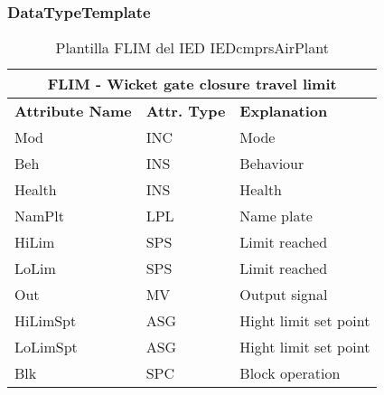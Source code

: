     \subsubsection{DataTypeTemplate}
    \begin{table}[H]
    \begin{center}
    \begin{tabular}{|l|l|p{8.5cm}|}
            \hline
            \multicolumn{3}{|c|}{\cellcolor[gray]{0.8} \textbf{ FLIM}  - Wicket gate closure travel limit} \\
            \hline
            \textbf{Attribute Name} & \textbf{Attr. Type} & \textbf{Explanation} \\
            \hline 
            Mod & INC & Mode \\
            \hline
            Beh & INS & Behaviour \\
            \hline
            Health & INS & Health \\
            \hline
            NamPlt & LPL & Name plate \\
            \hline
            HiLim & SPS & Limit reached \\
            \hline
            LoLim & SPS & Limit reached \\
            \hline
            Out & MV & Output signal \\
            \hline
            HiLimSpt & ASG & Hight limit set point \\
            \hline
            LoLimSpt & ASG & Hight limit set point \\
            \hline
            Blk & SPC & Block operation \\
            \hline
    \end{tabular}
    \caption{Plantilla FLIM del IED IEDcmprsAirPlant}
    \label{table:lnTypeFLIM_}
    \end{center}
    \end{table}
    
    
    